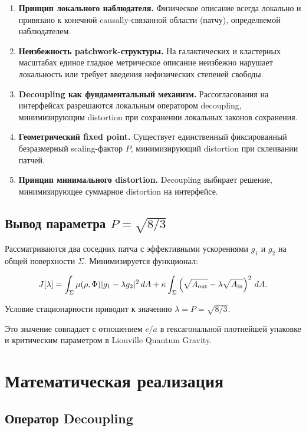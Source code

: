 \documentclass[12pt,a4paper]{article}
\begin{document}
\begin{enumerate}
\item \textbf{Принцип локального наблюдателя.} Физическое описание всегда локально и привязано к конечной causally-связанной области (патчу), определяемой наблюдателем.
\item \textbf{Неизбежность patchwork-структуры.} На галактических и кластерных масштабах единое гладкое метрическое описание неизбежно нарушает локальность или требует введения нефизических степеней свободы.
\item \textbf{Decoupling как фундаментальный механизм.} Рассогласования на интерфейсах разрешаются локальным оператором decoupling, минимизирующим distortion при сохранении локальных законов сохранения.
\item \textbf{Геометрический fixed point.} Существует единственный фиксированный безразмерный scaling-фактор \(P\), минимизирующий distortion при склеивании патчей.
\item \textbf{Принцип минимального distortion.} Decoupling выбирает решение, минимизирующее суммарное distortion на интерфейсе.
\end{enumerate}

\subsection{Вывод параметра \( P = \sqrt{8/3} \)}

Рассматриваются два соседних патча с эффективными ускорениями \(g_1\) и \(g_2\) на общей поверхности \(\Sigma\). Минимизируется функционал:

\begin{equation}
J[\lambda] = \int_{\Sigma} \mu(\rho,\Phi) |g_1 - \lambda g_2|^2 \, dA 
+ \kappa \int_{\Sigma} \left( \sqrt{A_{\rm out}} - \lambda \sqrt{A_{\rm in}} \right)^2 \, dA.
\end{equation}

Условие стационарности приводит к значению \(\lambda = P = \sqrt{8/3}\).

Это значение совпадает с отношением \(c/a\) в гексагональной плотнейшей упаковке и критическим параметром в Liouville Quantum Gravity.

\section{Математическая реализация}

\subsection{Оператор Decoupling}
\end{document}
